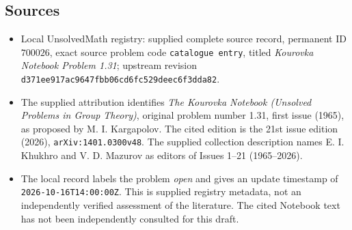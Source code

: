 \documentclass[11pt]{article}
\begin{document}
\subsection{Sources}
\begin{itemize}
\item Local UnsolvedMath registry: supplied complete source record, permanent ID \(700026\), exact source problem code \texttt{catalogue entry}, titled \emph{Kourovka Notebook Problem 1.31}; upstream revision \texttt{d371ee917ac9647fbb06cd6fc529deec6f3dda82}.
\item The supplied attribution identifies \emph{The Kourovka Notebook (Unsolved Problems in Group Theory)}, original problem number 1.31, first issue (1965), as proposed by M. I. Kargapolov. The cited edition is the 21st issue edition (2026), \texttt{arXiv:1401.0300v48}. The supplied collection description names E. I. Khukhro and V. D. Mazurov as editors of Issues 1--21 (1965--2026).
\item The local record labels the problem \emph{open} and gives an update timestamp of \texttt{2026-10-16T14:00:00Z}. This is supplied registry metadata, not an independently verified assessment of the literature. The cited Notebook text has not been independently consulted for this draft.
\end{itemize}
\end{document}
